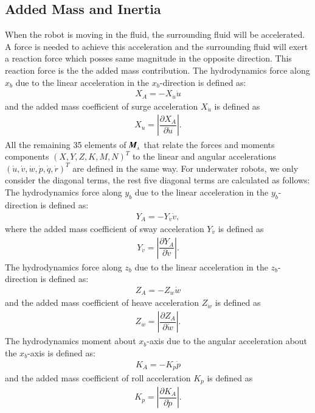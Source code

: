 \subsection{Added Mass and Inertia}
\label{addedmassdefi}
When the robot is moving in the fluid, the surrounding fluid will be accelerated. A force is needed to achieve this acceleration and the surrounding fluid will exert a reaction force which posses same magnitude in the opposite direction. This reaction force is the the added mass contribution. 
The hydrodynamics force along $x_{b}$ due to the linear acceleration in the $x_{b}$-direction is defined as:
\begin{align}
X_{A}=-X_{\dot{u}}\dot{u}
\end{align}
and the added mass coefficient of surge acceleration $X_{\dot{u}}$ is defined as
\begin{align}
X_{\dot{u}}=\left|\dfrac{\partial X_{A}}{\partial \dot{u}}\right|.
\end{align}
All the remaining 35 elements of $\emph{\textbf{M}}_{_{A}}$ that relate the forces and moments components $(X,Y,Z,K,M,N)^{T}$ to the linear and angular accelerations $(\dot{u},\dot{v},\dot{w},\dot{p},\dot{q},\dot{r})^{T}$ are defined in the same way. For underwater robots, we only consider the diagonal terms, the rest five diagonal terms are calculated as follows:
The hydrodynamics force along $y_{b}$ due to the linear acceleration in the $y_{b}$-direction is defined as:
\begin{align}
Y_{A}=-Y_{\dot{v}}\dot{v},
\end{align}
where the added mass coefficient of sway acceleration $Y_{\dot{v}}$ is defined as
\begin{align}
Y_{\dot{v}}=\left|\dfrac{\partial Y_{A}}{\partial \dot{v}}\right|.
\end{align}
The hydrodynamics force along $z_{b}$ due to the linear acceleration in the $z_{b}$-direction is defined as:
\begin{align}
Z_{A}=-Z_{\dot{w}}\dot{w}
\end{align}
and the added mass coefficient of heave acceleration $Z_{\dot{w}}$ is defined as
\begin{align}
Z_{\dot{w}}=\left|\dfrac{\partial Z_{A}}{\partial \dot{w}}\right|.
\end{align}
The hydrodynamics moment about $x_{b}$-axis due to the angular acceleration about the $x_{b}$-axis is defined as:
\begin{align}
K_{A}=-K_{\dot{p}}\dot{p}
\end{align}
and the added mass coefficient of roll acceleration $K_{\dot{p}}$ is defined as
\begin{align}
K_{\dot{p}}=\left|\dfrac{\partial K_{A}}{\partial \dot{p}}\right|.
\end{align}

